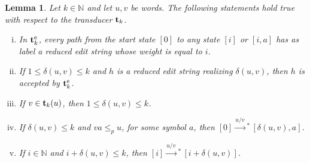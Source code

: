 \documentclass{article}
\theoremstyle{plain}
\newtheorem{lemma}[theorem]{Lemma}
\theoremstyle{definition}
\theoremstyle{remark}
\newcommand{\N}{\mathbb{N}}
\newcommand{\xras}[1]{\xrightarrow{#1}\!\!{}^*\,}
\newcommand\tsid{\trt_{k}}
\newcommand\dsid{\ensuremath{\delta}\xspace}
\newcommand{\etsid}{\tsid^{\mathrm{e}}}
\begin{document}
\begin{lemma}\label{lem:Adi:props}
Let $k\in\N$ and let $u,v$ be words. The following statements hold true with respect to the transducer $\tsid$.
\begin{enumerate}[i.)]
\item
In $\etsid$, every path from the start state $[0]$ to any state $[i]$ or $[i,a]$ has as label a reduced edit string
whose weight is equal to $i$.
\item
If $1\le\dsid(u,v)\le k$ and $h$ is a reduced edit string realizing $\dsid(u,v)$, then
$h$ is accepted by $\etsid$.
\item
If $v\in\tsid(u)$, then $1\le\dsid(u,v)\le k$.
\item
If $\dsid(u,v)\le k$ and $va \le_p u$, for some symbol $a$, then   $[0]\xras{u\slash v} [\dsid(u,v),a]$.
\item
If $i\in\N$ and $i+\dsid(u,v)\le k$, then $[i]\xras{u\slash v} [i+\dsid(u,v)]$.
\end{enumerate}
\end{lemma}
\end{document}
